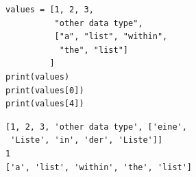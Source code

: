 \begin{frame}[fragile]
%
\begin{tcbraster}[raster columns=2,
                  raster equal height,
                  nobeforeafter,
                  raster column skip=0.5cm]
\begin{codebox}
\begin{verbatim}
values = [1, 2, 3, 
          "other data type", 
          ["a", "list", "within", 
           "the", "list"]
         ]
print(values)
print(values[0])
print(values[4])
\end{verbatim}
\end{codebox}
%
\begin{cmdbox}
\begin{verbatim}
[1, 2, 3, 'other data type', ['eine', 
 'Liste', 'in', 'der', 'Liste']]
1
['a', 'list', 'within', 'the', 'list']
\end{verbatim}
\end{cmdbox}
\end{tcbraster}
%
\end{frame}


